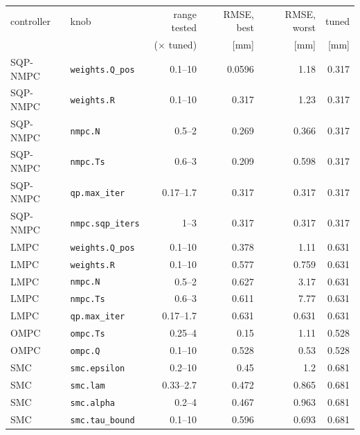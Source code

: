 \begin{tabular}{llrrrr}
\toprule
controller & knob & range tested & RMSE, best & RMSE, worst & tuned \\
 & & ($\times$ tuned) & [mm] & [mm] & [mm] \\
\midrule
SQP-NMPC & \texttt{weights.Q_pos} & 0.1--10 & 0.0596 & 1.18 & 0.317 \\
SQP-NMPC & \texttt{weights.R} & 0.1--10 & 0.317 & 1.23 & 0.317 \\
SQP-NMPC & \texttt{nmpc.N} & 0.5--2 & 0.269 & 0.366 & 0.317 \\
SQP-NMPC & \texttt{nmpc.Ts} & 0.6--3 & 0.209 & 0.598 & 0.317 \\
SQP-NMPC & \texttt{qp.max_iter} & 0.17--1.7 & 0.317 & 0.317 & 0.317 \\
SQP-NMPC & \texttt{nmpc.sqp_iters} & 1--3 & 0.317 & 0.317 & 0.317 \\
\addlinespace
LMPC & \texttt{weights.Q_pos} & 0.1--10 & 0.378 & 1.11 & 0.631 \\
LMPC & \texttt{weights.R} & 0.1--10 & 0.577 & 0.759 & 0.631 \\
LMPC & \texttt{nmpc.N} & 0.5--2 & 0.627 & 3.17 & 0.631 \\
LMPC & \texttt{nmpc.Ts} & 0.6--3 & 0.611 & 7.77 & 0.631 \\
LMPC & \texttt{qp.max_iter} & 0.17--1.7 & 0.631 & 0.631 & 0.631 \\
\addlinespace
OMPC & \texttt{ompc.Ts} & 0.25--4 & 0.15 & 1.11 & 0.528 \\
OMPC & \texttt{ompc.Q} & 0.1--10 & 0.528 & 0.53 & 0.528 \\
\addlinespace
SMC & \texttt{smc.epsilon} & 0.2--10 & 0.45 & 1.2 & 0.681 \\
SMC & \texttt{smc.lam} & 0.33--2.7 & 0.472 & 0.865 & 0.681 \\
SMC & \texttt{smc.alpha} & 0.2--4 & 0.467 & 0.963 & 0.681 \\
SMC & \texttt{smc.tau_bound} & 0.1--10 & 0.596 & 0.693 & 0.681 \\
\bottomrule
\end{tabular}
